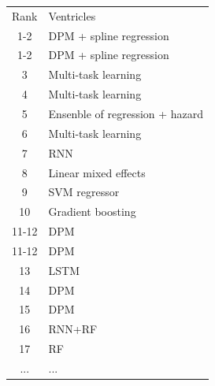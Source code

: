 \documentclass[8pt,xcolor=table,aspectratio=169]{beamer}
\begin{document}
\begin{frame}
\begin{columns}
\begin{column}[t]{0.5\textwidth}
\end{column}
\begin{column}[t]{0.5\textwidth}
 		
\begin{table}
 \fontsize{6}{8}\selectfont
\begin{tabular}{c|>{\centering\arraybackslash}m{3cm}}
 \Xhline{2.5\arrayrulewidth}
                   Rank &  Ventricles \\
 \Xhline{2.5\arrayrulewidth}
1-2& DPM + spline regression  \\
1-2 & DPM + spline regression  \\
3 & Multi-task learning\\
4 & Multi-task learning \\
5 & Ensenble of regression + hazard  \\
6 & Multi-task learning \\
\rowcolor{benchmarkCol} 7 &  RNN \\
8 & Linear mixed effects \\
9 & SVM regressor \\
10 & Gradient boosting \\
11-12 & DPM \\
11-12 & DPM \\
\rowcolor{benchmarkCol} 13 & LSTM  \\
14 & DPM \\
15 & DPM\\
\rowcolor{benchmarkCol} 16 &  RNN+RF \\
17 & RF\\
... & ...   \\ 
\end{tabular}
\end{table} 

 
\end{column}
\end{columns}

\end{frame}

\end{document}
